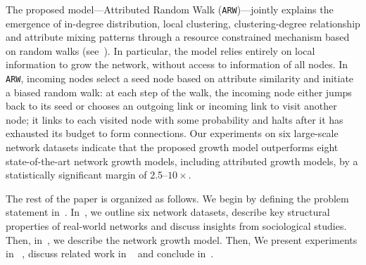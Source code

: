 The proposed model---Attributed Random Walk (\texttt{ARW})---jointly explains
the emergence of in-degree distribution, local clustering, clustering-degree
relationship and attribute mixing patterns through a resource constrained
mechanism based on random walks (see~). In particular,
the model relies entirely on local information to grow the network, without
access to information of all nodes. In \texttt{ARW}, incoming nodes select a
seed node based on attribute similarity and initiate a biased random walk: at
each step of the walk, the incoming node either jumps back to its seed or
chooses an outgoing link or incoming link to visit another node; it links to
each visited node with some probability and halts after it has exhausted its
budget to form connections.
Our experiments on six large-scale network datasets indicate that the proposed growth model outperforms
eight state-of-the-art network growth models, including attributed growth models, by a
statistically significant margin of 2.5--$10\times$.





The rest of the paper is organized as follows.
We begin by defining the problem statement in~.
In~, we outline six network datasets, describe key structural
properties of real-world networks and discuss insights from sociological studies.
Then, in~, we describe the network growth model. Then, We
present experiments in ~, discuss related work in ~ and conclude in~.
